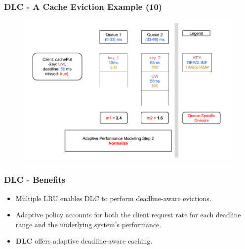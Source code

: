 \documentclass{beamer}
\newcommand{\myv}{\vspace{3 mm}}
\begin{document}
\begin{frame}
  \frametitle{DLC - A Cache Eviction Example (10)}
  \begin{figure}
    \begin{center}
      \centerline{\includegraphics[scale=0.33]{img/DLC_V6_10.png}}
    \end{center}
  \end{figure}
\end{frame}

\begin{frame}
  \frametitle{DLC - Benefits}
  \vspace{-15 mm}
  \begin{itemize}
  \item Multiple LRU enables DLC to perform deadline-aware evictions.
    \myv
  \item Adaptive policy accounts for both the client request rate for each
    deadline range and the underlying system's performance.
    \myv
  \item \textbf{DLC} offers adaptive deadline-aware caching.
  \end{itemize}
\end{frame}
\end{document}
